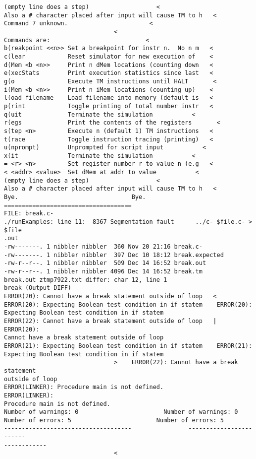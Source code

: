\documentclass[12pt]{book}
\begin{document}
\begin{lstlisting}
(empty line does a step)                   <
Also a # character placed after input will cause TM to h   <
Command 7 unknown.                       <
                               <
Commands are:                           <
b(reakpoint <<n>> Set a breakpoint for instr n.  No n m   <
c(lear            Reset simulator for new execution of    <
d(Mem <b <n>>     Print n dMem locations (counting down   <
e(xecStats        Print execution statistics since last   <
g(o               Execute TM instructions until HALT       <
i(Mem <b <n>>     Print n iMem locations (counting up)    <
l(oad filename    Load filename into memory (default is   <
p(rint            Toggle printing of total number instr   <
q(uit             Terminate the simulation           <
r(egs             Print the contents of the registers       <
s(tep <n>         Execute n (default 1) TM instructions   <
t(race            Toggle instruction tracing (printing)   <
u(nprompt)        Unprompted for script input           <
x(it              Terminate the simulation           <
= <r> <n>         Set register number r to value n (e.g   <
< <addr> <value>  Set dMem at addr to value           <
(empty line does a step)                   <
Also a # character placed after input will cause TM to h   <
Bye.                                Bye.
====================================
FILE: break.c-
./runExamples: line 11:  8367 Segmentation fault      ../c- $file.c- > $file
.out
-rw-------. 1 nibbler nibbler  360 Nov 20 21:16 break.c-
-rw-------. 1 nibbler nibbler  397 Dec 10 18:12 break.expected
-rw-r--r--. 1 nibbler nibbler  509 Dec 14 16:52 break.out
-rw-r--r--. 1 nibbler nibbler 4096 Dec 14 16:52 break.tm
break.out ztmp7922.txt differ: char 12, line 1
break (Output DIFF)
ERROR(20): Cannot have a break statement outside of loop   <
ERROR(20): Expecting Boolean test condition in if statem    ERROR(20): 
Expecting Boolean test condition in if statem
ERROR(22): Cannot have a break statement outside of loop   |    ERROR(20): 
Cannot have a break statement outside of loop
ERROR(21): Expecting Boolean test condition in if statem    ERROR(21): 
Expecting Boolean test condition in if statem
                               >    ERROR(22): Cannot have a break statement
outside of loop
ERROR(LINKER): Procedure main is not defined.            ERROR(LINKER): 
Procedure main is not defined.
Number of warnings: 0                        Number of warnings: 0
Number of errors: 5                        Number of errors: 5
------------------------------------                ------------------------
------------
                               <

\end{lstlisting}
\end{document}
